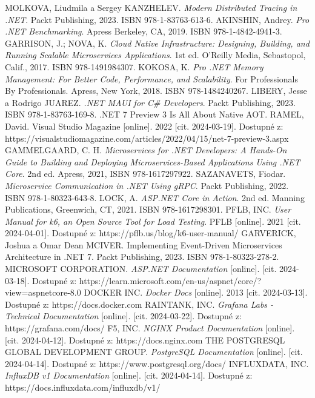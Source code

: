 \documentclass[a4paper,12pt]{article}
\begin{document}
{MOLKOVA, Liudmila a Sergey KANZHELEV. \emph{Modern Distributed Tracing in .NET}. Packt Publishing, 2023. ISBN 978-1-83763-613-6.
AKINSHIN, Andrey. \emph{Pro .NET Benchmarking}. Apress Berkeley, CA, 2019. ISBN 978-1-4842-4941-3.
GARRISON, J.; NOVA, K. \emph{Cloud Native Infrastructure: Designing, Building, and Running Scalable Microservices Applications}. 1st ed. O'Reilly Media, Sebastopol, Calif., 2017. ISBN 978-1491984307.
KOKOSA, K. \emph{Pro .NET Memory Management: For Better Code, Performance, and Scalability}. For Professionals By Professionals. Apress, New York, 2018. ISBN 978-1484240267.
LIBERY, Jesse a Rodrigo JUAREZ. \emph{.NET MAUI for C\# Developers}. Packt Publishing, 2023. ISBN 978-1-83763-169-8.
.NET 7 Preview 3 Is All About Native AOT. RAMEL, David. Visual Studio Magazine [online]. 2022 [cit. 2024-03-19]. Dostupné z: https://visualstudiomagazine.com/articles/2022/04/15/net-7-preview-3.aspx
GAMMELGAARD, C. H. \emph{Microservices for .NET Developers: A Hands-On Guide to Building and Deploying Microservices-Based Applications Using .NET Core}. 2nd ed. Apress, 2021, ISBN 978-1617297922.
SAZANAVETS, Fiodar. \emph{Microservice Communication in .NET Using gRPC}. Packt Publishing, 2022. ISBN 978-1-80323-643-8.
LOCK, A. \emph{ASP.NET Core in Action}. 2nd ed. Manning Publications, Greenwich, CT, 2021. ISBN 978-1617298301.
PFLB, INC. \emph{User Manual for k6, an Open Source Tool for Load Testing}. PFLB [online]. 2021 [cit. 2024-04-01]. Dostupné z: https://pflb.us/blog/k6-user-manual/
GARVERICK, Joshua a Omar Dean MCIVER. Implementing Event-Driven Microservices Architecture in .NET 7. Packt Publishing, 2023. ISBN 978-1-80323-278-2.
MICROSOFT CORPORATION. \emph{ASP.NET Documentation} [online]. [cit. 2024-03-18]. Dostupné z: https://learn.microsoft.com/en-us/aspnet/core/?view=aspnetcore-8.0
DOCKER INC. \emph{Docker Docs} [online]. 2013 [cit. 2024-03-13]. Dostupné z: https://docs.docker.com
RAINTANK, INC. \emph{Grafana Labs - Technical Documentation} [online]. [cit. 2024-03-22]. Dostupné z: https://grafana.com/docs/
 F5, INC. \emph{NGINX Product Documentation} [online]. [cit. 2024-04-12]. Dostupné z: https://docs.nginx.com
THE POSTGRESQL GLOBAL DEVELOPMENT GROUP. \emph{PostgreSQL Documentation} [online]. [cit. 2024-04-14]. Dostupné z: https://www.postgresql.org/docs/
INFLUXDATA, INC. \emph{InfluxDB v1 Documentation} [online]. [cit. 2024-04-14]. Dostupné z: https://docs.influxdata.com/influxdb/v1/
}
\end{document}
